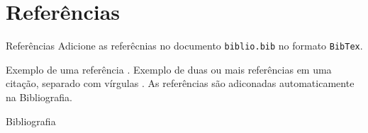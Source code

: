 \documentclass{beamer}
\begin{document}
\section{Referências}
\begin{frame}{Referências}
    Adicione as referêcnias no documento  \texttt{biblio.bib} no formato \texttt{BibTex}.

    Exemplo de uma referência \cite{zhang2017digital}.
    Exemplo de duas ou mais referências em uma citação, separado com vírgulas \cite{praks2018advanced,santos2018online}.
    As referências são adiconadas automaticamente na Bibliografia.
\end{frame}

\begin{frame}[allowframebreaks]{Bibliografia}


\end{frame}


\begin{frame}
    \maketitle
\end{frame}
\end{document}
